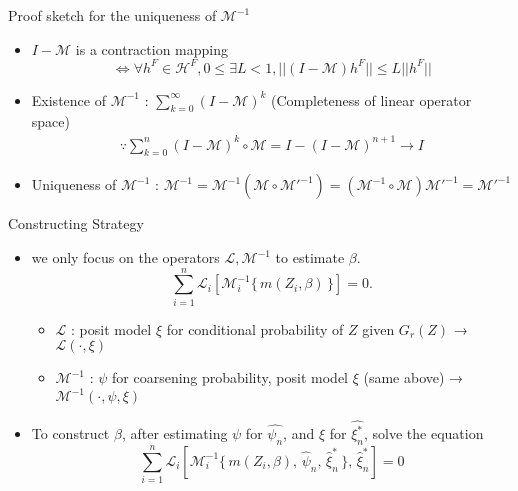 \documentclass[xcolor=dvipsnames,aspectratio=169]{beamer}
\newcommand{\1}{\mathbbm{1}}
\begin{document}
\begin{frame}{Proof sketch for the uniqueness of $\mathcal{M}^{-1}$}
  \begin{itemize}
    \item $I-\mathcal{M}$ is a contraction mapping 
    \[
    \Leftrightarrow \forall h^F\in\mathcal{H}^F, 0\leq \exists L<1, ||(I-\mathcal{M})h^F||\leq L||h^F||
    \]
    \item Existence of $\mathcal{M}^{-1}$ : $\sum_{k=0}^{\infty}(I-\mathcal{M})^k$ (Completeness of linear operator space)
    \begin{align*}
      \because \sum_{k=0}^n(I-\mathcal{M})^k\circ \mathcal{M}=I-(I-\mathcal{M})^{n+1}\rightarrow I \tag{as $n\to \infty$}
    \end{align*}
    \item Uniqueness of $\mathcal{M}^{-1}$ : $\mathcal{M}^{-1}=\mathcal{M}^{-1}(\mathcal{M}\circ \mathcal{M'}^{-1})=(\mathcal{M}^{-1}\circ \mathcal{M})\mathcal{M'}^{-1}=\mathcal{M'}^{-1}$
  \end{itemize}
\end{frame}

\begin{frame}{Constructing Strategy}
  \begin{itemize}
    \item we only focus on the operators $\mathcal{L}, \mathcal{M}^{-1}$ to estimate $\beta$.
    \[
    \sum_{i=1}^{n}
  \mathcal{L}_{i}\!\left[
    \mathcal{M}_{i}^{-1}\{\, m(Z_{i},\beta)\,\}
  \right]
= 0.
    \]
    \begin{itemize}
      \item $\mathcal{L}$ : posit model $\xi$ for conditional probability of $Z$ given $G_r(Z)$ → $\mathcal{L}(\cdot, \xi)$
      \item $\mathcal{M}^{-1}$ : $\psi$ for coarsening probability, posit model $\xi$ (same above) → $\mathcal{M}^{-1}(\cdot, \psi, \xi)$
    \end{itemize}
    \item To construct $\beta$, after estimating $\psi$ for $\hat{\psi_n}$, and $\xi$ for $\hat{\xi_n^*}$, solve the equation
    \[
    \sum_{i=1}^{n}
  \mathcal{L}_{i}\!\left[
    \mathcal{M}_{i}^{-1}\{\, m(Z_{i},\beta),\, \hat{\psi}_{n},\, \hat{\xi}^{\ast}_{n}\,\},
    \, \hat{\xi}^{\ast}_{n}
  \right]
= 0
    \]
  \end{itemize}
\end{frame}
\end{document}

